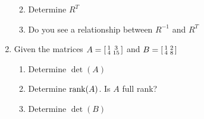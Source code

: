\documentclass{16384_doc}
\begin{document}
\begin{questions}
\begin{parts}
\begin{enumerate}
\begin{enumerate}
                    		\begin{tcolorbox}[height=3cm]
                            
                            \end{tcolorbox}
                    
                    		\item Determine $R^{T}$
                    		
                    		\begin{tcolorbox}[height=3cm]
                    		
                            \end{tcolorbox}
                    		
                    		\item Do you see a relationship between $R^{-1}$ and 
                    		$R^{T}$
                    		
                    		\begin{tcolorbox}[height=5cm]
                    	
                            \end{tcolorbox}
                    	\end{enumerate}
                    \item Given the matrices $A = \left[\begin{smallmatrix}1&3\\4&15\end{smallmatrix}\right]$ and $B = 
                    \left[\begin{smallmatrix}1&2\\4&8\end{smallmatrix}\right]$
                    \begin{enumerate}
						\item Determine $\det(A)$
						
						\begin{tcolorbox}[height=3cm]
					
                        \end{tcolorbox}
						\item Determine $\operatorname{rank}(A)$. Is $A$ full rank?
						\begin{tcolorbox}[height=3cm]
				
                        \end{tcolorbox}
						\item Determine $\det(B)$
						\begin{tcolorbox}[height=3cm]
					

\end{tcolorbox}
\end{enumerate}
\end{enumerate}
\end{parts}
\end{questions}
\end{document}
